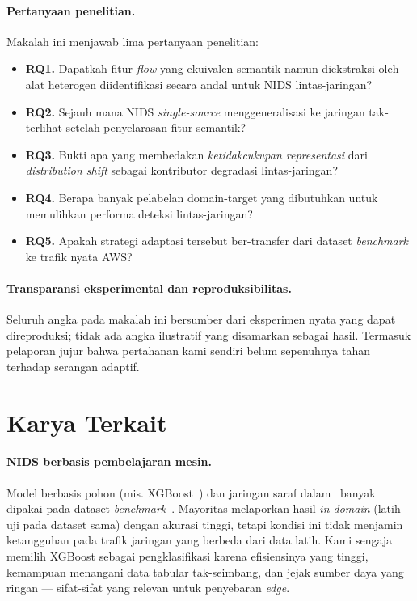 \documentclass[11pt,a4paper]{article}
\begin{document}
\paragraph{Pertanyaan penelitian.} Makalah ini menjawab lima pertanyaan penelitian:
\begin{itemize}
  \item \textbf{RQ1.} Dapatkah fitur \emph{flow} yang ekuivalen-semantik namun
  diekstraksi oleh alat heterogen diidentifikasi secara andal untuk NIDS
  lintas-jaringan?
  \item \textbf{RQ2.} Sejauh mana NIDS \emph{single-source} menggeneralisasi ke
  jaringan tak-terlihat setelah penyelarasan fitur semantik?
  \item \textbf{RQ3.} Bukti apa yang membedakan \emph{ketidakcukupan representasi}
  dari \emph{distribution shift} sebagai kontributor degradasi lintas-jaringan?
  \item \textbf{RQ4.} Berapa banyak pelabelan domain-target yang dibutuhkan untuk
  memulihkan performa deteksi lintas-jaringan?
  \item \textbf{RQ5.} Apakah strategi adaptasi tersebut ber-transfer dari dataset
  \emph{benchmark} ke trafik nyata AWS?
\end{itemize}

\paragraph{Transparansi eksperimental dan reproduksibilitas.} Seluruh angka pada makalah ini bersumber
dari eksperimen nyata yang dapat direproduksi; tidak ada angka ilustratif yang
disamarkan sebagai hasil.\ifadversarial{} Termasuk pelaporan jujur bahwa pertahanan kami sendiri
belum sepenuhnya tahan terhadap serangan adaptif.\fi

\section{Karya Terkait}
\label{sec:related}

\paragraph{NIDS berbasis pembelajaran mesin.} Model berbasis pohon (mis.
XGBoost~\cite{xgboost,husain,zhou}) dan jaringan saraf
dalam~\cite{shone,liulang,mahdavifar,wu,duan} banyak dipakai pada dataset
\emph{benchmark}~\cite{unsw,cicids}. Mayoritas melaporkan hasil \emph{in-domain}
(latih-uji pada dataset sama) dengan akurasi tinggi, tetapi kondisi ini tidak
menjamin ketangguhan pada trafik jaringan yang berbeda dari data latih. Kami
sengaja memilih XGBoost sebagai pengklasifikasi karena efisiensinya yang tinggi,
kemampuan menangani data tabular tak-seimbang, dan jejak sumber daya yang ringan
--- sifat-sifat yang relevan untuk penyebaran \emph{edge}.
\end{document}
